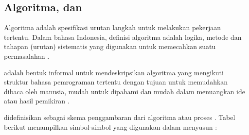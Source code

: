 \documentclass[../main.tex]{subfiles}
\begin{document}
\subsection{Algoritma, {\Pseudocode} dan {\Flowchart}}
Algoritma adalah spesifikasi urutan langkah untuk melakukan pekerjaan tertentu. Dalam bahasa Indonesia, definisi algoritma adalah logika, metode dan tahapan (urutan) sistematis yang digunakan untuk memecahkan suatu permasalahan \parencite{utami10}.

{\Pseudocode} adalah bentuk informal untuk mendeskripsikan algoritma yang mengikuti struktur bahasa pemrograman tertentu dengan tujuan untuk memudahkan dibaca oleh manusia, mudah untuk dipahami dan mudah dalam menuangkan ide atau hasil pemikiran \parencite{harumy2016belajar}.

{\Flowchart} didefinisikan sebagai skema penggambaran dari algoritma atau proses \parencite{harumy2016belajar}. Tabel berikut menampilkan simbol-simbol yang digunakan dalam menyusun {\flowchart} \parencite{samala2021pemrograman}:
\end{document}
